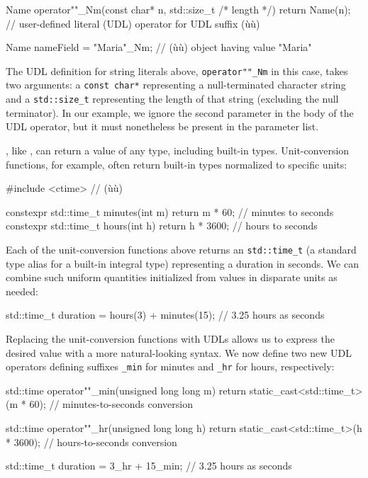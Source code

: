 \begin{emcppslisting}
Name operator""_Nm(const char* n, std::size_t /* length */) { return Name(n); }
    // user-defined literal (UDL) operator for UDL suffix (ù{}ù)

Name nameField = "Maria"_Nm;  // (ù{}ù) object having value "Maria"
\end{emcppslisting}
    
\noindent The UDL definition for string literals above, \lstinline!operator""_Nm! in
this case, takes two arguments: a \lstinline!const!~\lstinline!char*!
representing a null-terminated character string and a
\lstinline!std::size_t! representing the length of that string (excluding
the null terminator). In our example, we ignore the second parameter in
the body of the UDL operator, but it must nonetheless be present in the
parameter list.

, like , can return a
value of any type, including built-in types. Unit-conversion functions,
for example, often return built-in types normalized to specific units:

\begin{emcppslisting}
#include <ctime>  // (ù{}ù)

constexpr std::time_t minutes(int m) { return m * 60; }    // minutes to seconds
constexpr std::time_t hours(int h)   { return h * 3600; }  // hours to seconds
\end{emcppslisting}
    
\noindent Each of the unit-conversion functions above returns an
\lstinline!std::time_t! (a standard type alias for a built-in integral
type) representing a duration in seconds. We can combine such uniform
quantities initialized from values in disparate units as needed:

\begin{emcppslisting}
std::time_t duration = hours(3) + minutes(15);   // 3.25 hours as seconds
\end{emcppslisting}
    
\noindent Replacing the unit-conversion functions with UDLs allows us to express
the desired value with a more natural-looking syntax. We now define two
new UDL operators defining suffixes \lstinline!_min! for minutes and
\lstinline!_hr! for hours, respectively:

\begin{emcppslisting}
std::time operator""_min(unsigned long long m)
{
    return static_cast<std::time_t>(m * 60);  // minutes-to-seconds conversion
}

std::time operator""_hr(unsigned long long h)
{
    return static_cast<std::time_t>(h * 3600);  // hours-to-seconds conversion
}

std::time_t duration = 3_hr + 15_min;  // 3.25 hours as seconds
\end{emcppslisting}
    
